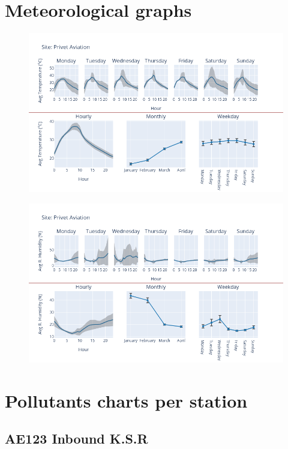 \documentclass[12pt, oneside]{book}
\begin{document}
\chapter{Meteorological graphs}
{
{\begin{figure}[H]
\centering
\includegraphics[width=.90\textwidth]{image24}
\end{figure}}{}
{\begin{figure}[H]
\centering
\includegraphics[width=.90\textwidth, keepaspectratio]{image25}
\end{figure}}{}


\chapter{Pollutants charts per station}
\section{AE123 Inbound K.S.R}

}
\end{document}
